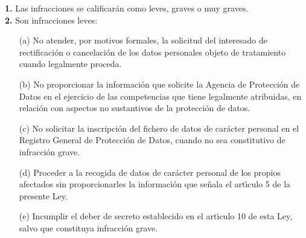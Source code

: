 {\bf 1.} Las infracciones se calificar\'an como leves, graves o muy
graves.\\

{\bf 2.} Son infracciones leves: \begin{itemize} \item[(a)] No atender,
por motivos formales, la solicitud del interesado de rectificaci\'on
o cancelaci\'on de los datos personales objeto de tratamiento cuando
legalmente proceda.  \item [(b)] No proporcionar la informaci\'on que
solicite la Agencia de Protecci\'on de Datos en el ejercicio de las
competencias que tiene legalmente atribuidas, en relaci\'on con aspectos
no sustantivos de la protecci\'on de datos.  \item [(c)] No solicitar
la inscripci\'on del fichero de datos de car\'acter personal en el
Registro General de Protecci\'on de Datos, cuando no sea constitutivo
de infracci\'on grave.  \item [(d)] Proceder a la recogida de datos
de car\'acter personal de los propios afectados sin proporcionarles
la informaci\'on que se\~nala el art\'{\i}culo 5 de la presente Ley.
\item [(e)] Incumplir el deber de secreto establecido en el art\'{\i}culo
10 de esta Ley, salvo que constituya infracci\'on grave.  \end{itemize}

